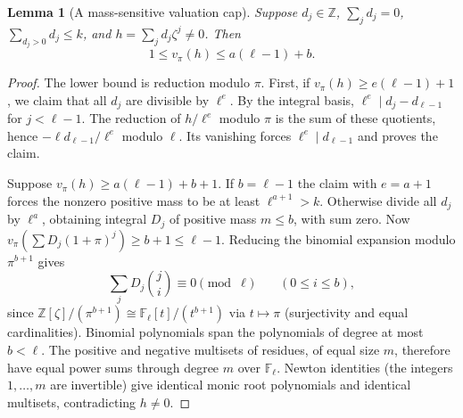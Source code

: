 \documentclass[11pt]{article}
\newtheorem{lemma}[theorem]{Lemma}
\theoremstyle{remark}\newtheorem{remark}[theorem]{Remark}
\newcommand{\F}{\mathbb F}
\newcommand{\Z}{\mathbb Z}
\begin{document}
\begin{lemma}[A mass-sensitive valuation cap]\label{lem:cap}
Suppose $d_j\in\Z$, $\sum_jd_j=0$, $\sum_{d_j>0}d_j\le k$, and $h=\sum_j d_j\zeta^j\ne0$. Then
\[
 1\le v_\pi(h)\le a(\ell-1)+b.
\]
\end{lemma}
\begin{proof}
The lower bound is reduction modulo $\pi$. First, if $v_\pi(h)\ge e(\ell-1)+1$, we claim that all $d_j$ are divisible by $\ell^e$. By the integral basis, $\ell^e\mid d_j-d_{\ell-1}$ for $j<\ell-1$. The reduction of $h/\ell^e$ modulo $\pi$ is the sum of these quotients, hence $-\ell d_{\ell-1}/\ell^e$ modulo $\ell$. Its vanishing forces $\ell^e\mid d_{\ell-1}$ and proves the claim.

Suppose $v_\pi(h)\ge a(\ell-1)+b+1$. If $b=\ell-1$ the claim with $e=a+1$ forces the nonzero positive mass to be at least $\ell^{a+1}>k$. Otherwise divide all $d_j$ by $\ell^a$, obtaining integral $D_j$ of positive mass $m\le b$, with sum zero. Now $v_\pi(\sum D_j(1+\pi)^j)\ge b+1\le\ell-1$. Reducing the binomial expansion modulo $\pi^{b+1}$ gives
\[
 \sum_j D_j\binom ji\equiv0\pmod\ell\qquad(0\le i\le b),
\]
since $\Z[\zeta]/(\pi^{b+1})\cong\F_\ell[t]/(t^{b+1})$ via $t\mapsto\pi$ (surjectivity and equal cardinalities). Binomial polynomials span the polynomials of degree at most $b<\ell$. The positive and negative multisets of residues, of equal size $m$, therefore have equal power sums through degree $m$ over $\F_\ell$. Newton identities (the integers $1,\ldots,m$ are invertible) give identical monic root polynomials and identical multisets, contradicting $h\ne0$.
\end{proof}
\end{document}
